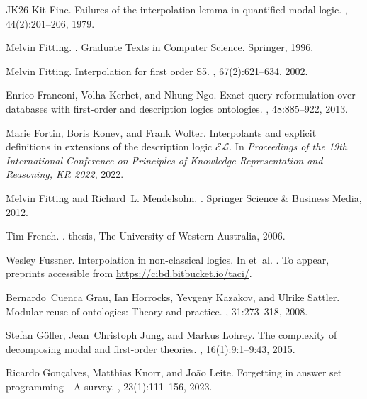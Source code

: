 \documentclass[10pt,a4paper]{amsart}
\theoremstyle{plain}
\theoremstyle{definition}
\begin{document}
\begin{thebibliography}{{}JK{\etalchar{+}}26}
Kit Fine.
\newblock Failures of the interpolation lemma in quantified modal logic.
, 44(2):201--206, 1979.

Melvin Fitting.
.
\newblock Graduate Texts in Computer Science. Springer, 1996.

Melvin Fitting.
\newblock Interpolation for first order {S5}.
, 67(2):621--634, 2002.

Enrico Franconi, Volha Kerhet, and Nhung Ngo.
\newblock Exact query reformulation over databases with first-order and description logics ontologies.
, 48:885--922, 2013.

Marie Fortin, Boris Konev, and Frank Wolter.
\newblock Interpolants and explicit definitions in extensions of the description logic $\mathcal{EL}$.
\newblock In {\em Proceedings of the 19th International Conference on Principles of Knowledge Representation and Reasoning, {KR} 2022}, 2022.

Melvin Fitting and Richard~L. Mendelsohn.
.
\newblock Springer Science \& Business Media, 2012.

Tim French.
.
 thesis, The University of Western Australia, 2006.

Wesley Fussner.
\newblock Interpolation in non-classical logics.
\newblock In {} et~al. \cite{taci}.
\newblock To appear, preprints accessible from \url{https://cibd.bitbucket.io/taci/}.

Bernardo~Cuenca Grau, Ian Horrocks, Yevgeny Kazakov, and Ulrike Sattler.
\newblock Modular reuse of ontologies: Theory and practice.
, 31:273--318, 2008.

Stefan G{\"{o}}ller, Jean~Christoph Jung, and Markus Lohrey.
\newblock The complexity of decomposing modal and first-order theories.
, 16(1):9:1--9:43, 2015.

Ricardo Gon{\c{c}}alves, Matthias Knorr, and Jo{\~{a}}o Leite.
\newblock Forgetting in answer set programming - {A} survey.
, 23(1):111--156, 2023.


\end{thebibliography}
\end{document}
